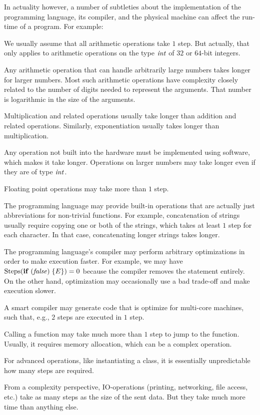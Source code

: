 In actuality however, a number of subtleties about the implementation of the programming language, its compiler, and the physical machine can affect the run-time of a program.
For example:
\begin{compactitem}
 \item We usually assume that all arithmetic operations take $1$ step.
   But actually, that only applies to arithmetic operations on the type $\mathit{int}$ of $32$ or $64$-bit integers.
  \begin{compactitem}
    \item Any arithmetic operation that can handle arbitrarily large numbers takes longer for larger numbers.
     Most such arithmetic operations have complexity closely related to the number of digits needed to represent the arguments.
     That number is logarithmic in the size of the arguments.
    \item Multiplication and related operations usually take longer than addition and related operations.
    Similarly, exponentiation usually takes longer than multiplication.
    \item Any operation not built into the hardware must be implemented using software, which makes it take longer.
     Operations on larger numbers may take longer even if they are of type $\mathit{int}$.
  \end{compactitem} 
 \item Floating point operations may take more than $1$ step.
 \item The programming language may provide built-in operations that are actually just abbreviations for non-trivial functions.
  For example, concatenation of strings usually require copying one or both of the strings, which takes at least $1$ step for each character.
  In that case, concatenating longer strings takes longer.
 \item The programming language's compiler may perform arbitrary optimizations in order to make execution faster.
  For example, we may have $\compl(\aifI{\false}{E})=0$ because the compiler removes the statement entirely.
  On the other hand, optimization may occasionally use a bad trade-off and make execution slower.
 \item A smart compiler may generate code that is optimize for multi-core machines, such that, e.g., $2$ steps are executed in $1$ step.
 \item Calling a function may take much more than $1$ step to jump to the function.
  Usually, it requires memory allocation, which can be a complex operation.
 \item For advanced operations, like instantiating a class, it is essentially unpredictable how many steps are required.
 \item From a complexity perspective, IO-operations (printing, networking, file access, etc.) take as many steps as the size of the sent data.
 But they take much more time than anything else.
\end{compactitem}

